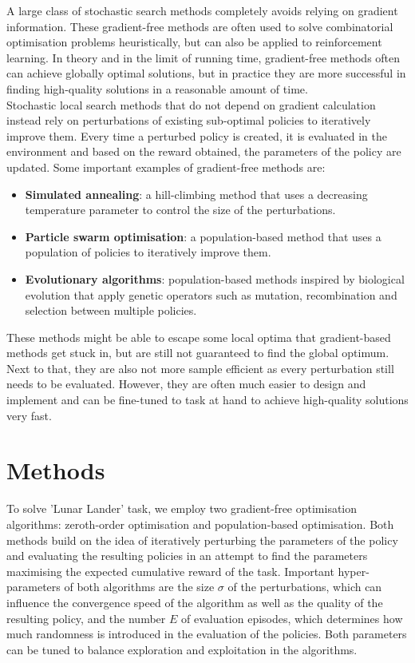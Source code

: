 \documentclass[10pt]{article}
\begin{document}
A large class of stochastic search methods completely avoids relying on gradient information.
These gradient-free methods are often used to solve combinatorial optimisation problems heuristically, but can also be applied to reinforcement learning.
In theory and in the limit of running time, gradient-free methods often can achieve globally optimal solutions, but in practice they are more successful in finding high-quality solutions in a reasonable amount of time.\\
Stochastic local search methods that do not depend on gradient calculation instead rely on perturbations
of existing sub-optimal policies to iteratively improve them. Every time a perturbed policy is
created, it is evaluated in the environment and based on the reward obtained, the parameters of the policy are updated.
Some important examples of gradient-free methods are:
\begin{itemize}
    \item \textbf{Simulated annealing}: a hill-climbing method that uses a decreasing temperature
          parameter to control the size of the perturbations.
    \item \textbf{Particle swarm optimisation}: a population-based method that uses a population of
          policies to iteratively improve them.
    \item \textbf{Evolutionary algorithms}: population-based methods inspired by biological evolution that apply genetic operators such as mutation, recombination and selection between multiple policies.
\end{itemize}
These methods might be able to escape some local optima that gradient-based methods get stuck in, but are still not guaranteed to find the global optimum. Next to that, they are also not more sample efficient as every perturbation still needs to be evaluated. However, they are often much easier to 
design and implement and can be fine-tuned to task at hand to achieve high-quality solutions very fast.
\cite{HO}

\section{Methods}

To solve 'Lunar Lander' task,
we employ two gradient-free optimisation algorithms:
zeroth-order optimisation and population-based optimisation.
Both methods build on the idea of iteratively perturbing the parameters of the policy and evaluating the resulting policies
in an attempt to find the parameters maximising the expected cumulative reward of the task.
Important hyper-parameters of both algorithms are the size $\sigma$ of the perturbations, which can influence the convergence
speed of the algorithm as well as the quality of the resulting policy, and the number $E$ of evaluation episodes, which determines
how much randomness is introduced in the evaluation of the policies.
Both parameters can be tuned to balance exploration and exploitation in the algorithms.
\end{document}
